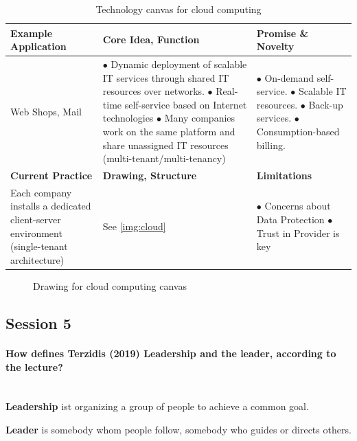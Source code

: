 \documentclass[10pt,a4paper,noendnumber=true]{scrartcl}
\newcommand{\properparagraph}[1]{\paragraph{\textcolor{Emerald}{#1}}\mbox{}\\}
\begin{document}
\begin{table}[H]
		\centering
		\caption{Technology canvas for cloud computing}
		\begin{tabularx}{\textwidth}{XXX}
			\toprule
			\textbf{Example Application} & \textbf{Core Idea, Function} & \textbf{Promise \& Novelty} \\
			\midrule
			Web Shops, Mail & 
		    $\bullet$ Dynamic deployment of scalable IT services through shared IT resources over networks. \newline	
			$\bullet$ Real-time self-service based on Internet technologies \newline			
			$\bullet$ Many companies work on the same platform and share unassigned IT resources (multi-tenant/multi-tenancy)			 
            &   
			$\bullet$ On-demand self-service.\newline			
			$\bullet$ Scalable IT resources.\newline			
			$\bullet$ Back-up services.\newline			
			$\bullet$ Consumption-based billing. 
			\\
			\midrule
			\textbf{Current Practice} & \textbf{Drawing, Structure} & \textbf{Limitations} \\
			\midrule
			Each company installs a dedicated client-server environment (single-tenant architecture) & See \autoref{img:cloud} & $\bullet$ Concerns about Data Protection \newline $\bullet$ Trust in Provider is key\\
			\bottomrule
		\end{tabularx}
\end{table}

\begin{figure}[H]
    \centering
    \def\svgwidth{0.7\textwidth}
    
    \caption{Drawing for cloud computing canvas}
    \label{img:cloud}
\end{figure}







\newpage
\subsection{Session 5}
\properparagraph{How defines Terzidis (2019) Leadership and the leader, according to the lecture?}
\textbf{Leadership} ist organizing a group of people to achieve a common goal.

\textbf{Leader} is somebody whom people follow, somebody who guides or directs others.
\end{document}
